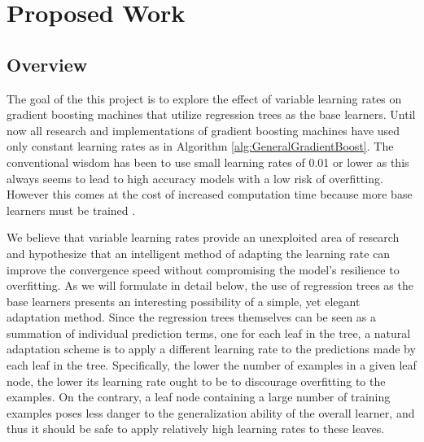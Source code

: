 \documentclass[runningheads]{llncs}
\begin{document}
\newpage
\section{Proposed Work}

\subsection{Overview} 
The goal of the this project is to explore the effect of variable learning rates on gradient boosting machines that utilize regression trees as the base learners. Until now all research and implementations of gradient boosting machines have used only constant learning rates as in Algorithm \ref{alg:GeneralGradientBoost}. The conventional wisdom has been to use small learning rates of 0.01 or lower as this always seems to lead to high accuracy models with a low risk of overfitting. However this comes at the cost of increased computation time because more base learners must be trained \cite{2012ridgeway}. 

We believe that variable learning rates provide an unexploited area of research and hypothesize that an intelligent method of adapting the learning rate can improve the convergence speed without compromising the model's resilience to overfitting. As we will formulate in detail below, the use of regression trees as the base learners presents an interesting possibility of a simple, yet elegant adaptation method. Since the regression trees themselves can be seen as a summation of individual prediction terms, one for each leaf in the tree, a natural adaptation scheme is to apply a different learning rate to the predictions made by each leaf in the tree. Specifically, the lower the number of examples in a given leaf node, the lower its learning rate ought to be to discourage overfitting to the examples. On the contrary, a leaf node containing a large number of training examples poses less danger to the generalization ability of the overall learner, and thus it should be safe to apply relatively high learning rates to these leaves. 
\end{document}
